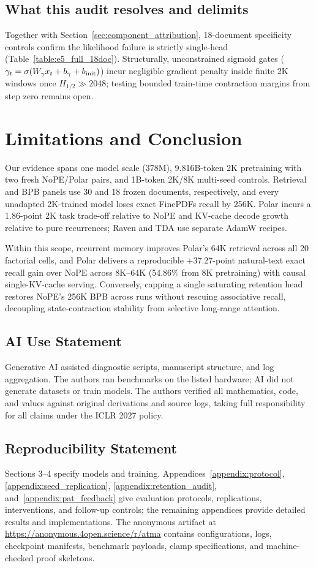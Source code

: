 \documentclass{article}
\newcommand{\rev}[1]{{\color{revcolor}#1}}
\newenvironment{revblock}{\color{revcolor}}{}
\begin{document}
\subsection{What this audit resolves and delimits}
\begin{revblock}
Together with Section~\ref{sec:component_attribution}, 18-document specificity controls confirm the likelihood failure is strictly single-head (Table~\ref{table:e5_full_18doc}). Structurally, unconstrained sigmoid gates ($\gamma_t=\sigma(W_\gamma x_t+b_\gamma+b_{\rm init})$) incur negligible gradient penalty inside finite 2K windows once $H_{1/2}\gg 2048$; testing bounded train-time contraction margins from step zero remains open.
\end{revblock}

\section{Limitations and Conclusion}
\rev{Our evidence spans one model scale (378M), 9.816B-token 2K pretraining with two fresh NoPE/Polar pairs, and 1B-token 2K/8K multi-seed controls.} Retrieval and BPB panels use 30 and 18 frozen documents, respectively, and every unadapted 2K-trained model loses exact FinePDFs recall by 256K. Polar incurs a 1.86-point 2K task trade-off relative to NoPE and KV-cache decode growth relative to pure recurrences; Raven and TDA use separate AdamW recipes.

Within this scope, recurrent memory improves Polar's 64K retrieval across all 20 factorial cells, \rev{and Polar delivers a reproducible +37.27-point natural-text exact recall gain over NoPE across 8K--64K (54.86\% from 8K pretraining) with causal single-KV-cache serving. Conversely, capping a single saturating retention head restores NoPE's 256K BPB across runs without rescuing associative recall, decoupling state-contraction stability from selective long-range attention.}

\subsection*{AI Use Statement}
Generative AI assisted diagnostic scripts, manuscript structure, and log aggregation. The authors ran benchmarks on the listed hardware; AI did not generate datasets or train models. The authors verified all mathematics, code, and values against original derivations and source logs, taking full responsibility for all claims under the ICLR 2027 policy.

\subsection*{Reproducibility Statement}
Sections 3--4 specify models and training. Appendices~\ref{appendix:protocol}, \ref{appendix:seed_replication}, \ref{appendix:retention_audit}, and~\ref{appendix:pat_feedback} give evaluation protocols, replications, interventions, and follow-up controls; the remaining appendices provide detailed results and implementations. The anonymous artifact at \url{https://anonymous.4open.science/r/atma} contains configurations, logs, checkpoint manifests, benchmark payloads, clamp specifications, and machine-checked proof skeletons.

\clearpage



\appendix

\end{document}
